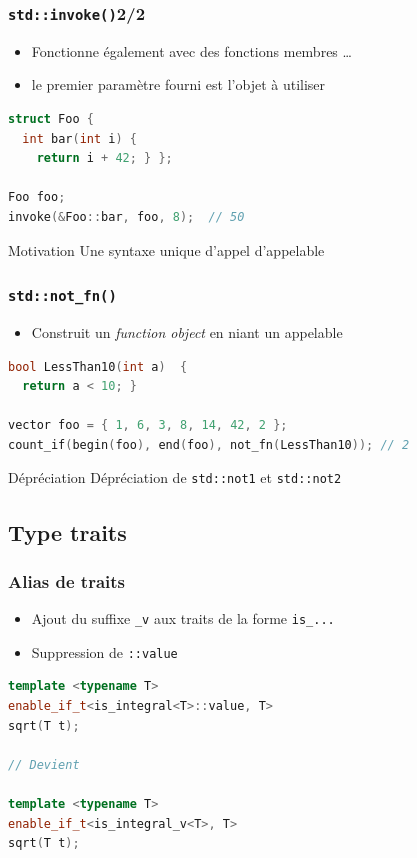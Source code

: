 \documentclass[C++.tex]{subfiles}
\begin{document}
\begin{frame}[fragile]
	\frametitle{\lstinline|std::invoke()|\titlehfill{}2/2}
	\begin{itemize}
		\item Fonctionne également avec des fonctions membres \ldots
		\item le premier paramètre fourni est l'objet à utiliser
	\end{itemize}

	\begin{lstlisting}[language=C++]
struct Foo {
  int bar(int i) {
    return i + 42; } };

Foo foo;
invoke(&Foo::bar, foo, 8);  // 50\end{lstlisting}

	\begin{block}{Motivation}
		Une syntaxe unique d'appel d'appelable
	\end{block}
\end{frame}

\begin{frame}[fragile]
	\frametitle{\lstinline|std::not_fn()|}
	\begin{itemize}
		\item Construit un \textit{function object} en niant un appelable
	\end{itemize}

	\begin{lstlisting}[language=C++]
bool LessThan10(int a) 	{
  return a < 10; }
	
vector foo = { 1, 6, 3, 8, 14, 42, 2 };
count_if(begin(foo), end(foo), not_fn(LessThan10)); // 2\end{lstlisting}

	\begin{block}{Dépréciation}
		Dépréciation de \lstinline|std::not1| et \lstinline|std::not2|
	\end{block}
\end{frame}

\subsection*{Type traits}
\begin{frame}[fragile]
	\frametitle{Alias de traits}
	\begin{itemize}
		\item Ajout du suffixe \lstinline|_v| aux traits de la forme \lstinline|is_...|
		\item Suppression de \lstinline|::value|
	\end{itemize}

	\begin{lstlisting}[language=C++]
template <typename T>
enable_if_t<is_integral<T>::value, T>
sqrt(T t);

// Devient 

template <typename T>
enable_if_t<is_integral_v<T>, T>
sqrt(T t);\end{lstlisting}


\end{frame}
\end{document}
